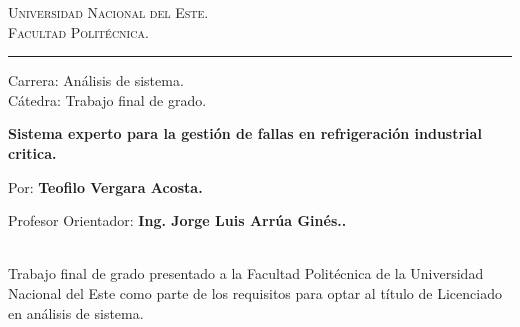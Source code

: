 \vspace*{-3cm}
\begin{figure}[h]
\leavevmode
\begin{minipage}{\textwidth}
\begin{center}
\end{center}
\end{minipage}
\end{figure}

\thispagestyle{empty}

{\bf
\begin{center}
\large
\vspace*{-1 cm}\Large \textsc{Universidad Nacional del Este.} \\
\Large \textsc{Facultad Politécnica.} \\
\vspace*{0.5 cm}\hrule
\vspace*{0.5 cm}\Large Carrera: Análisis de sistema.\\
\vspace*{0 cm}\Large Cátedra: Trabajo final de grado.\\
\end{center}
}

\vspace{3.5 cm}
{
\noindent
\begin{center}
\huge \bf Sistema experto para la gestión de fallas en refrigeración industrial critica.
\end{center}
}


\vspace{0.5 cm}
{ 

Por: \textbf{\Large Teofilo Vergara Acosta.}

\vspace*{.5 cm}
Profesor Orientador: \textbf{\large Ing. Jorge Luis Arrúa Ginés..}
}%
\vspace*{0.5 cm}\\
Trabajo final de grado presentado a la Facultad Politécnica de la Universidad Nacional del Este como parte de los requisitos para optar al título de Licenciado en análisis de sistema.


